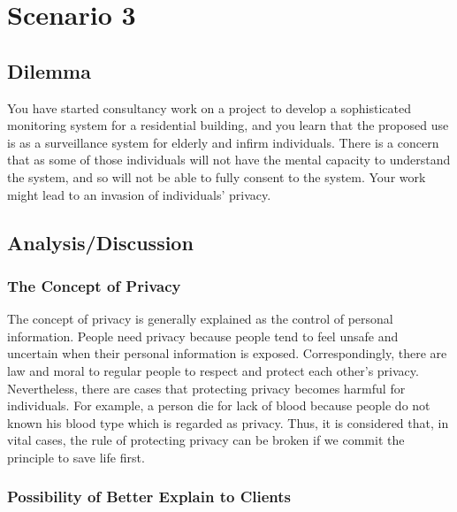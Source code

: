 \documentclass[11pt, a4paper]{article}
\begin{document}
\newpage

\section{Scenario 3}

\subsection{Dilemma}

You have started consultancy work on a project to develop a sophisticated monitoring system for a residential building, and you learn that the proposed use is as a surveillance system for elderly and infirm individuals. There is a concern that as some of those individuals will not have the mental capacity to understand the system, and so will not be able to fully consent to the system. Your work might lead to an invasion of individuals’ privacy.


\subsection{Analysis/Discussion}

\subsubsection{The Concept of Privacy}

The concept of privacy is generally explained as the control of personal information. People need privacy because people tend to feel unsafe and uncertain when their personal information is exposed. Correspondingly, there are law and moral to regular people to respect and protect each other's privacy. Nevertheless, there are cases that protecting privacy becomes harmful for individuals. For example, a person die for lack of blood because people do not known his blood type which is regarded as privacy. Thus, it is considered that, in vital cases, the rule of protecting privacy can be broken if we commit the principle to save life first.

\subsubsection{Possibility of Better Explain to Clients}
\end{document}
